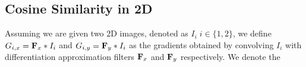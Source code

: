 \subsection{Cosine Similarity in 2D}\label{subsec:cosine_2d}
Assuming we are given two 2D images, denoted as $I_i \; i \in \{1,2\}$, we
define $G_{i,x} = \boldsymbol{\mathbf{F}}_x \ast I_i$ and $G_{i,y} = \boldsymbol{\mathbf{F}}_y \ast I_i$
as the gradients obtained by convolving $I_i$ with differentiation approximation
filters $\boldsymbol{\mathbf{F}}_x$ and $\boldsymbol{\mathbf{F}}_y$ respectively. We denote the
